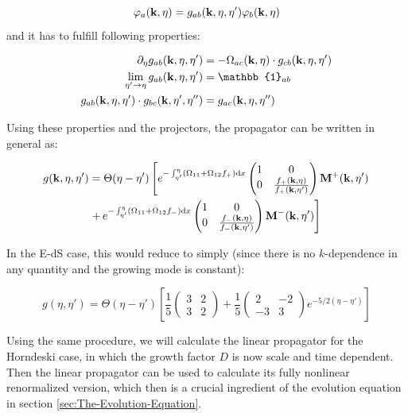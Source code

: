\[
\varphi_{a}(\mathbf{k},\eta)=g_{ab}(\mathbf{k},\eta,\eta')\varphi_{b}(\mathbf{k},\eta)
\]
and it has to fulfill following properties:

\begin{align*}
\pet g_{ab}(\vk k,\eta,\eta') & =-\Omega_{ac}\pkn\cdot g_{cb}(\vk k,\eta,\eta')\\
\lim_{\eta'\rightarrow\eta}g_{ab}(\vk k,\eta,\eta') & =\mathbb{1}_{ab}\\
g_{ab}(\vk k,\eta,\eta')\cdot g_{bc}(\vk k,\eta',\eta'') & =g_{ac}(\vk k,\eta,\eta'')
\end{align*}


Using these properties and the projectors, the propagator can be written
in general as:

\begin{equation}
\begin{aligned}g(\mathbf{k},\eta,\eta') & =\Theta(\eta-\eta')\left[e^{-\int_{\eta'}^{\eta}(\Omega_{11}+\Omega_{12}f_{+})\mathrm{d} x}\begin{pmatrix}1 & 0\\
0 & \frac{f_{+}(\mathbf{k},\eta)}{f_{+}(\mathbf{k},\eta')}
\end{pmatrix}\mathrm{\mathbf{M}}{}^{+}(\mathbf{k},\eta')\right.\\
 & \left.+\, e^{-\int_{\eta'}^{\eta}(\Omega_{11}+\Omega_{12}f_{-})\mathrm{d} x}\begin{pmatrix}1 & 0\\
0 & \frac{f_{-}(\mathbf{k},\eta)}{f_{-}(\mathbf{k},\eta')}
\end{pmatrix}\mathrm{\mathbf{M}}{}^{-}(\mathbf{k},\eta')\right]
\end{aligned}
\label{eq:general-propagator}
\end{equation}


In the E-dS case, this would reduce to simply (since there is no $k$-dependence
in any quantity and the growing mode is constant):

\[
g(\eta,\eta')=\Theta(\eta-\eta')\left[\frac{1}{5}\begin{pmatrix}3 & 2\\
3 & 2
\end{pmatrix}+\frac{1}{5}\begin{pmatrix}2 & -2\\
-3 & 3
\end{pmatrix}e^{-5/2(\eta-\eta')}\right]
\]


Using the same procedure, we will calculate the linear propagator
for the Horndeski case, in which the growth factor $D$ is now scale
and time dependent. Then the linear propagator can be used to calculate
its fully nonlinear renormalized version, which then is a crucial
ingredient of the evolution equation in section \ref{sec:The-Evolution-Equation}.


